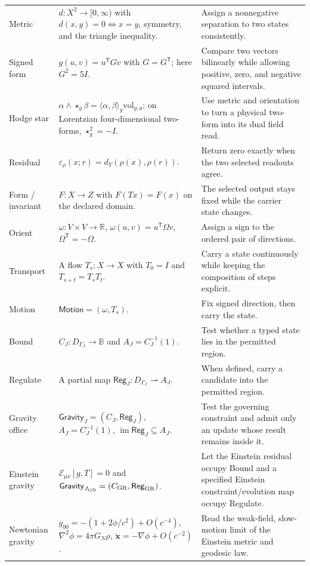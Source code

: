 \documentclass[10pt]{article}
\newcommand{\R}{\mathbb R}
\begin{document}
\begin{longtable}{@{}p{}p{}p{}@{}}
Metric & $d:X^2\to[0,\infty)$ with $d(x,y)=0\Leftrightarrow x=y$, symmetry, and the triangle inequality. & Assign a nonnegative separation to two states consistently.\\
Signed form & $g(u,v)=u^{\mathsf T}Gv$ with $G=G^{\mathsf T}$; here $G^2=5I$. & Compare two vectors bilinearly while allowing positive, zero, and negative squared intervals.\\
Hodge star & $\alpha\wedge\star_g\beta=\langle\alpha,\beta\rangle_g\mathrm{vol}_{g,\mathfrak o}$; on Lorentzian four-dimensional two-forms, $\star_g^2=-I$. & Use metric and orientation to turn a physical two-form into its dual field read.\\
Residual & $\varepsilon_\rho(x;r)=d_Y(\rho(x),\rho(r))$. & Return zero exactly when the two selected readouts agree.\\
Form / invariant & $F:X\to Z$ with $F(Tx)=F(x)$ on the declared domain. & The selected output stays fixed while the carrier state changes.\\
Orient & $\omega:V\times V\to\R$, $\omega(u,v)=u^{\mathsf T}\Omega v$, $\Omega^{\mathsf T}=-\Omega$. & Assign a sign to the ordered pair of directions.\\
Transport & A flow $T_s:X\to X$ with $T_0=I$ and $T_{s+t}=T_sT_t$. & Carry a state continuously while keeping the composition of steps explicit.\\
Motion & $\mathsf{Motion}=(\omega,T_s)$. & Fix signed direction, then carry the state.\\
Bound & $C_J:D_{\Gamma_J}\to\mathbb B$ and $A_J=C_J^{-1}(1)$. & Test whether a typed state lies in the permitted region.\\
Regulate & A partial map $\mathsf{Reg}_J:D_{\Gamma_J}\rightharpoonup A_J$. & When defined, carry a candidate into the permitted region.\\
Gravity office & $\mathsf{Gravity}_J=(C_J,\mathsf{Reg}_J)$, $A_J=C_J^{-1}(1)$, $\operatorname{im}\mathsf{Reg}_J\subseteq A_J$. & Test the governing constraint and admit only an update whose result remains inside it.\\
Einstein gravity & $\mathcal E_{\mu\nu}[g,T]=0$ and $\mathsf{Gravity}_{J_{\rm GR}}=(C_{\rm GR},\mathsf{Reg}_{\rm GR})$. & Let the Einstein residual occupy Bound and a specified Einstein constraint/evolution map occupy Regulate.\\
Newtonian gravity & $g_{00}=-(1+2\phi/c^2)+O(c^{-4})$, $\nabla^2\phi=4\pi G_N\rho$, $\ddot{\mathbf x}=-\nabla\phi+O(c^{-2})$. & Read the weak-field, slow-motion limit of the Einstein metric and geodesic law.\\

\end{longtable}
\end{document}
